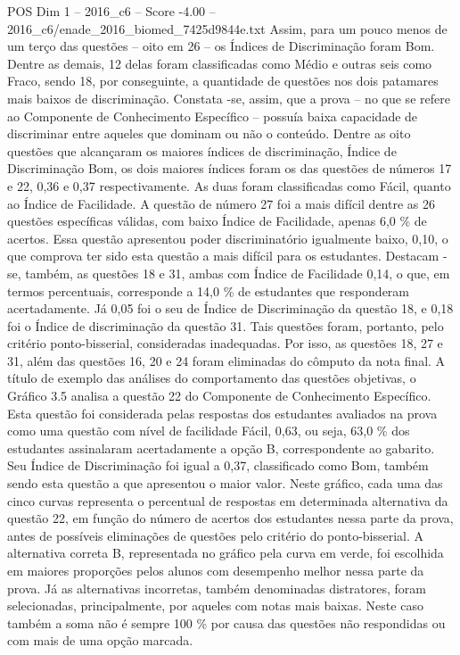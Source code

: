 \begin{textsample}{POS Dim 1 – 2016\_c6 – Score -4.00 – 2016\_c6/enade\_2016\_biomed\_7425d9844e.txt}
Assim, para um pouco menos de um terço das questões – oito em 26 – os Índices de Discriminação foram Bom.
Dentre as demais, 12 delas foram classificadas como Médio e outras seis como Fraco, sendo 18, por conseguinte, a quantidade de questões nos dois patamares mais baixos de discriminação.
Constata -se, assim, que a prova – no que se refere ao Componente de Conhecimento Específico – possuía baixa capacidade de discriminar entre aqueles que dominam ou não o conteúdo.
Dentre as oito questões que alcançaram os maiores índices de discriminação, Índice de Discriminação Bom, os dois maiores índices foram os das questões de números 17 e 22, 0,36 e 0,37 respectivamente.
As duas foram classificadas como Fácil, quanto ao Índice de Facilidade.
A questão de número 27 foi a mais difícil dentre as 26 questões específicas válidas, com baixo Índice de Facilidade, apenas 6,0 \% de acertos.
Essa questão apresentou poder discriminatório igualmente baixo, 0,10, o que comprova ter sido esta questão a mais difícil para os estudantes.
Destacam -se, também, as questões 18 e 31, ambas com Índice de Facilidade 0,14, o que, em termos percentuais, corresponde a 14,0 \% de estudantes que responderam acertadamente.
Já 0,05 foi o seu de Índice de Discriminação da questão 18, e 0,18 foi o Índice de discriminação da questão 31.
Tais questões foram, portanto, pelo critério ponto-bisserial, consideradas inadequadas.
Por isso, as questões 18, 27 e 31, além das questões 16, 20 e 24 foram eliminadas do cômputo da nota final.
A título de exemplo das análises do comportamento das questões objetivas, o Gráfico 3.5 analisa a questão 22 do Componente de Conhecimento Específico.
Esta questão foi considerada pelas respostas dos estudantes avaliados na prova como uma questão com nível de facilidade Fácil, 0,63, ou seja, 63,0 \% dos estudantes assinalaram acertadamente a opção B, correspondente ao gabarito.
Seu Índice de Discriminação foi igual a 0,37, classificado como Bom, também sendo esta questão a que apresentou o maior valor.
Neste gráfico, cada uma das cinco curvas representa o percentual de respostas em determinada alternativa da questão 22, em função do número de acertos dos estudantes nessa parte da prova, antes de possíveis eliminações de questões pelo critério do ponto-bisserial.
A alternativa correta B, representada no gráfico pela curva em verde, foi escolhida em maiores proporções pelos alunos com desempenho melhor nessa parte da prova.
Já as alternativas incorretas, também denominadas distratores, foram selecionadas, principalmente, por aqueles com notas mais baixas.
Neste caso também a soma não é sempre 100 \% por causa das questões não respondidas ou com mais de uma opção marcada.

\end{textsample}
